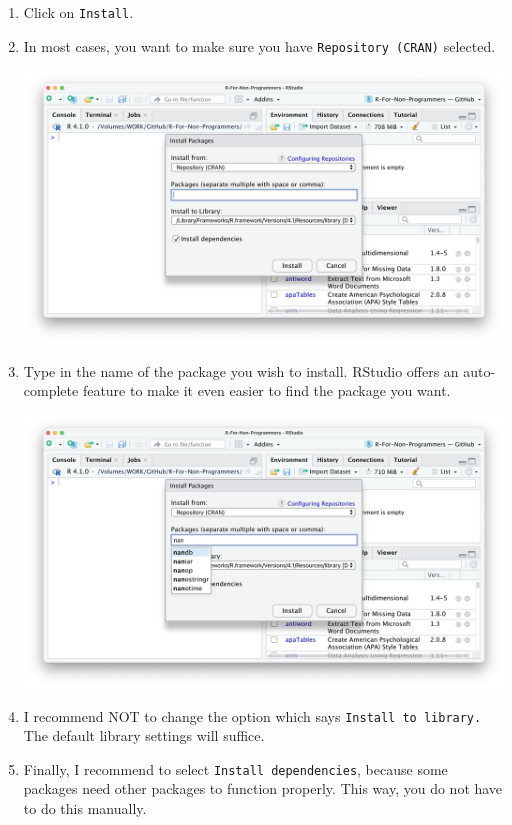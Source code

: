 \documentclass[
]{book}
\begin{document}
\begin{enumerate}
\def\labelenumi{\arabic{enumi}.}
\item
  Click on \texttt{Install}.
\item
  In most cases, you want to make sure you have \texttt{Repository\ (CRAN)} selected.

  \includegraphics{images/chapter_05_img/install_r_packages/01_install_r_packages.png}
\item
  Type in the name of the package you wish to install. RStudio offers an auto-complete feature to make it even easier to find the package you want.

  \includegraphics{images/chapter_05_img/install_r_packages/02_install_r_packages.png}
\item
  I recommend NOT to change the option which says \texttt{Install\ to\ library.} The default library settings will suffice.
\item
  Finally, I recommend to select \texttt{Install\ dependencies}, because some packages need other packages to function properly. This way, you do not have to do this manually.


\end{enumerate}
\end{document}
